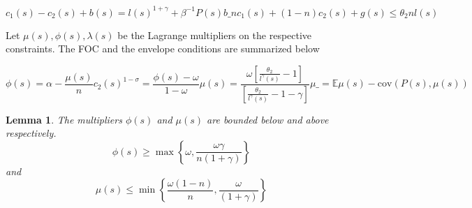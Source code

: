 \documentclass[thmsb,11pt]{article}
\newtheorem{lemma}{Lemma}
\newcommand{\cov}{\mathrm{cov}}
\begin{document}
   \begin{subequations}
   \label{sys- QLRA constraint}
   	\begin{equation}
   	\label{eq-implementability constraint}
   	c_1(s)-c_2(s)+b(s)=l(s)^{1+\gamma}+\beta^{-1} P(s)b\_
   	\end{equation}

 
\begin{equation}
	\label{eq-resoruces}
   	n c_1(s)+(1-n)c_2(s)+g(s)\leq\theta_2 n l(s)
\end{equation}   


   \end{subequations}

Let $\mu(s),\phi(s),\lambda(s)$ be the Lagrange multipliers on the respective constraints. The FOC and the envelope conditions are summarized below


\begin{subequations}
   \label{sys-FOC QLRA}
   \begin{equation}
   \label{eq- foc c1 QLRA}
    \phi(s)=\alpha-\frac{\mu(s)}{n}
   \end{equation}

   	\begin{equation}
   	\label{eq-foc c_2 QLRA}
   	c_2(s)^{1-\sigma}=\frac{\phi(s)-\omega }{1-\omega}
   	\end{equation}
   	\begin{equation}
\label{eq-foc l_1 QLRA}
   \mu(s)= \frac{\omega\left[\frac{\theta_2}{l^{\gamma}(s)}-1\right]	}{\left[\frac{\theta_2}{l^{\gamma}(s)}-1-\gamma\right]}
   	\end{equation}

   	\begin{equation}
\label{eq-foc b(s) QLRA}
   \mu\_=\mathbb{E}\mu(s)-\cov(P(s),\mu(s))
   	\end{equation}   	
 \end{subequations}


\begin{lemma}
\label{lem-bounds on multipliers}
The multipliers $\phi(s)$ and $\mu(s)$ are bounded below and above respectively.
\[\phi(s)\geq \max \left \{\omega,\frac{\omega \gamma}{n(1+\gamma)} \right\}\] and
\[\mu(s)\leq  \min \left \{\frac{\omega (1-n)}{n},\frac{\omega }{(1+\gamma)} \right\}\]
\end{lemma}
\end{document}
